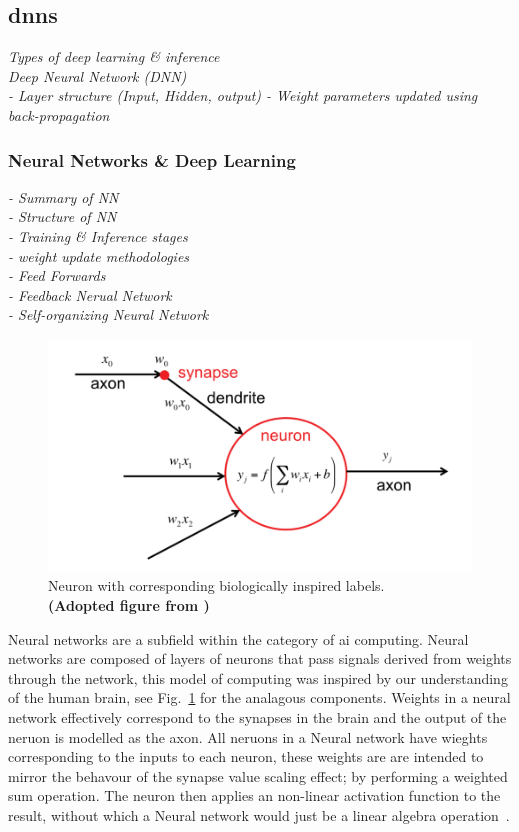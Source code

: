 \documentclass[11pt]{article}
\begin{document}
\subsection{\Acrlong*{dnn}s}\label{subsec:deepLearning}
\emph{
Types of deep learning \& inference\\
Deep Neural Network (DNN)\\
 - Layer structure (Input, Hidden, output)
 - Weight parameters updated using back-propagation
}

\subsubsection{Neural Networks \& Deep Learning}
\emph{
    - Summary of NN\\
    - Structure of NN\\
    - Training \& Inference stages\\
    - weight update methodologies\\
    - Feed Forwards\\
    - Feedback Nerual Network\\
    - Self-organizing Neural Network\\
}
\begin{figure}
    \includegraphics[width=1\textwidth]{Perceptron_efficient_proc.png}
    \caption{Neuron with corresponding biologically inspired labels.\\ \textbf{(Adopted figure from \autocite{szeEfficientProcessingDeep2017})}}
    \label{fig:neuronLabeled}
\end{figure}
Neural networks are a subfield within the category of \Acrlong{ai} computing. Neural networks are composed of layers of neurons that pass signals derived from weights through the network, this model of computing was inspired by our understanding of the human brain, see Fig.~\ref{fig:neuronLabeled} for the analagous components. Weights in a neural network effectively correspond to the synapses in the brain and the output of the neruon is modelled as the axon. All neruons in a Neural network have wieghts corresponding to the inputs to each neuron, these weights are are intended to mirror the behavour of the synapse value scaling effect; by performing a weighted sum operation. The neuron then applies an non-linear activation function to the result, without which a Neural network would just be a linear algebra operation~\autocite{szeEfficientProcessingDeep2017}.\\
\end{document}
